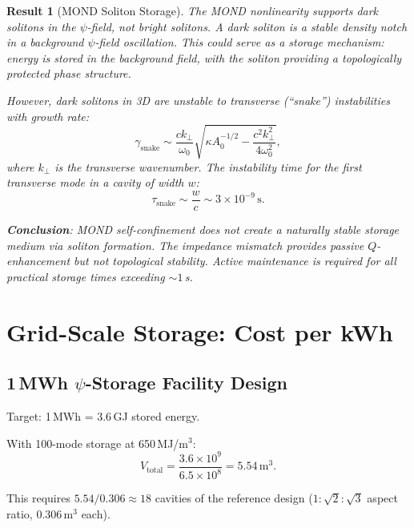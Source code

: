 \documentclass[11pt]{article}
\newtheorem{result}[theorem]{Result}
\theoremstyle{definition}
\theoremstyle{remark}
\begin{document}
\begin{result}[MOND Soliton Storage]\label{res:soliton}
The MOND nonlinearity supports \emph{dark solitons} in the $\psi$-field,
not bright solitons. A dark soliton is a stable density notch in a
background $\psi$-field oscillation. This could serve as a storage
mechanism: energy is stored in the background field, with the soliton
providing a topologically protected phase structure.

However, dark solitons in 3D are unstable to transverse (``snake'')
instabilities with growth rate:
\begin{equation}
\gamma_{\mathrm{snake}} \sim \frac{c k_\perp}{\omega_0}
\sqrt{\kappa A_0^{-1/2} - \frac{c^2 k_\perp^2}{4\omega_0^2}},
\end{equation}
where $k_\perp$ is the transverse wavenumber. The instability
time for the first transverse mode in a cavity of width $w$:
\begin{equation}
\tau_{\mathrm{snake}} \sim \frac{w}{c} \sim 3 \times 10^{-9}\,\mathrm{s}.
\end{equation}

\textbf{Conclusion}: MOND self-confinement does not create a
naturally stable storage medium via soliton formation. The impedance
mismatch provides passive $Q$-enhancement but not topological
stability. Active maintenance is required for all practical storage
times exceeding $\sim 1$\,s.
\end{result}

\section{Grid-Scale Storage: Cost per kWh}
\label{sec:grid-cost}

\subsection{1\,MWh $\psi$-Storage Facility Design}

Target: 1\,MWh = 3.6\,GJ stored energy.

With 100-mode storage at 650\,MJ/m$^3$:
\begin{equation}
V_{\mathrm{total}} = \frac{3.6 \times 10^9}{6.5 \times 10^8}
= 5.54\,\mathrm{m}^3.
\end{equation}

This requires $5.54 / 0.306 \approx 18$ cavities of the reference
design ($1:\sqrt{2}:\sqrt{3}$ aspect ratio, 0.306\,m$^3$ each).
\end{document}
